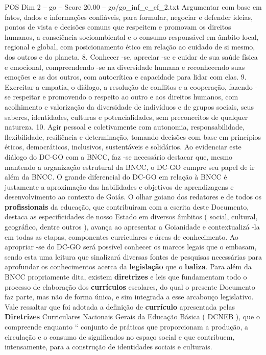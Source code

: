 \begin{textsample}{POS Dim 2 – go – Score 20.00 – go/go\_inf\_e\_ef\_2.txt}
Argumentar com base em fatos, dados e informações confiáveis, para formular, negociar e defender ideias, pontos de vista e decisões comuns que respeitem e promovam os direitos humanos, a consciência socioambiental e o consumo responsável em âmbito local, regional e global, com posicionamento ético em relação ao cuidado de si mesmo, dos outros e do planeta. 8.
Conhecer -se, apreciar -se e cuidar de sua saúde física e emocional, compreendendo -se na diversidade humana e reconhecendo suas emoções e as dos outros, com autocrítica e capacidade para lidar com elas. 9.
Exercitar a empatia, o diálogo, a resolução de conflitos e a cooperação, fazendo -se respeitar e promovendo o respeito ao outro e aos direitos humanos, com acolhimento e valorização da diversidade de indivíduos e de grupos sociais, seus saberes, identidades, culturas e potencialidades, sem preconceitos de qualquer natureza. 10.
Agir pessoal e coletivamente com autonomia, responsabilidade, flexibilidade, resiliência e determinação, tomando decisões com base em princípios éticos, democráticos, inclusivos, sustentáveis e solidários.
Ao evidenciar este diálogo do DC-GO com a BNCC, faz -se necessário destacar que, mesmo mantendo a organização estrutural da BNCC, o DC-GO cumpre seu papel de ir além da BNCC.
O grande diferencial do DC-GO em relação à BNCC é justamente a aproximação das habilidades e objetivos de aprendizagens e desenvolvimento ao contexto de Goiás.
O olhar goiano dos redatores e de todos os \textbf{profissionais} da educação, que contribuíram com a escrita deste Documento, destaca as especificidades de nosso Estado em diversos âmbitos ( social, cultural, geográfico, dentre outros ), avança ao apresentar a Goianidade e contextualizá -la em todas as etapas, componentes curriculares e áreas de conhecimento.
Ao apropriar -se do DC-GO será possível conhecer os marcos legais que o embasam, sendo esta uma leitura que sinalizará diversas fontes de pesquisas necessárias para aprofundar os conhecimentos acerca da \textbf{legislação} que o \textbf{baliza}.
Para além da BNCC propriamente dita, existem \textbf{diretrizes} e leis que fundamentam todo o processo de elaboração dos \textbf{currículos} escolares, do qual o presente Documento faz parte, mas não de forma única, e sim integrada a esse arcabouço legislativo.
Vale ressaltar que foi adotada a definição de \textbf{currículo} apresentada pelas \textbf{Diretrizes} Curriculares Nacionais Gerais da Educação Básica ( DCNEB ), que o compreende enquanto “ conjunto de práticas que proporcionam a produção, a circulação e o consumo de significados no espaço social e que contribuem, intensamente, para a construção de identidades sociais e culturais.

\end{textsample}

